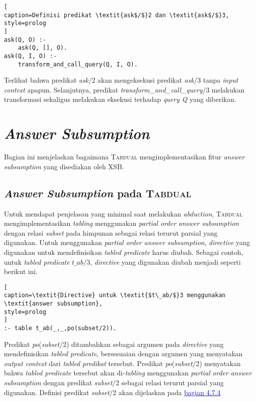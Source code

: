 \begin{lstlisting}[
caption=Definisi predikat \textit{ask$/$}2 dan \textit{ask$/$}3,
style=prolog
]
ask(Q, O) :- 
	ask(Q, [], O).
ask(Q, I, O) :-
	transform_and_call_query(Q, I, O).
\end{lstlisting}

Terlihat bahwa predikat \textit{ask$/$}2 akan mengeksekusi predikat \textit{ask$/$}3 tanpa \textit{input context} apapun. Selanjutnya, predikat \textit{transform\_and\_call\_query$/$}3 melakukan transformasi sekaligus melakukan eksekusi terhadap \textit{query Q} yang diberikan.

\section{\textit{Answer Subsumption}}

Bagian ini menjelaskan bagaimana \textsc{Tabdual} mengimplementasikan fitur \textit{answer subsumption} yang disediakan oleh XSB.

\subsection{\textit{Answer Subsumption} pada \textsc{Tabdual}}
Untuk mendapat penjelasan yang minimal saat melakukan \textit{abduction}, \textsc{Tabdual} mengimplementasikan \textit{tabling} menggunakan \textit{partial order answer subsumption} dengan relasi \textit{subset} pada himpunan sebagai relasi terurut parsial yang digunakan. Untuk menggunakan \textit{partial order answer subsumption}, \textit{directive} yang digunakan untuk mendefinisikan \textit{tabled predicate} harus diubah. Sebagai contoh, untuk \textit{tabled predicate} \textit{$t\_ab/$}3, \textit{directive} yang digunakan diubah menjadi seperti berikut ini.
\\

\begin{lstlisting}[
caption=\textit{Directive} untuk \textit{$t\_ab/$}3 menggunakan \textit{answer subsumption},
style=prolog
]
:- table t_ab(_,_,po(subset/2)).
\end{lstlisting}

Predikat \textit{po}(\textit{subset$/$}2) ditambahkan sebagai argumen pada \textit{directive} yang mendefinisikan \textit{tabled predicate}, bersesuaian dengan argumen yang menyatakan \textit{output context} dari \textit{tabled predikat} tersebut. Predikat \textit{po}(\textit{subset$/$}2) menyatakan bahwa \textit{tabled predicate} tersebut akan di-\textit{tabling} menggunakan \textit{partial order answer subsumption} dengan predikat \textit{subset$/$}2 sebagai relasi terurut parsial yang digunakan. Definisi predikat \textit{subset$/$}2 akan dijelaskan pada \hyperref[subset]{\textcolor{blue}{bagian 4.7.4}}

